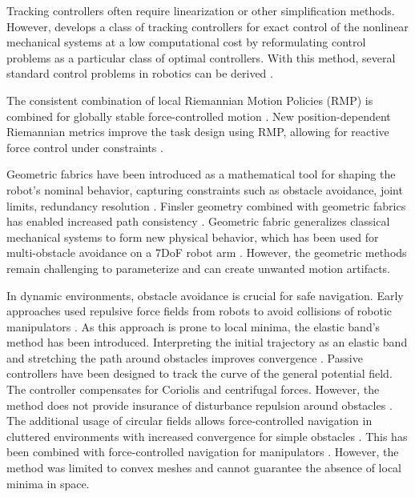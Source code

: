 \documentclass[conference]{IEEEtran}
\begin{document}
Tracking controllers often require linearization or other simplification methods. However, \cite{udwadia2003new} develops a class of tracking controllers for exact control of the nonlinear mechanical systems at a low computational cost by reformulating control problems as a particular class of optimal controllers. With this method, several standard control problems in robotics can be derived \cite{peters2008unifying}.

The consistent combination of local Riemannian Motion Policies (RMP) is combined for globally stable force-controlled motion \cite{cheng2020rmp}.
New position-dependent Riemannian metrics improve the task design using RMP, allowing for reactive force control under constraints \cite{bylard2021composable}.

Geometric fabrics have been introduced as a mathematical tool for shaping the robot's nominal behavior, capturing constraints such as obstacle avoidance, joint limits, redundancy resolution
\cite{xie2020geometric}.
Finsler geometry combined with geometric fabrics has enabled increased path consistency \cite{ratliff2021generalized}.
Geometric fabric generalizes classical mechanical systems to form new physical behavior, which has been used for multi-obstacle avoidance on a 7DoF robot arm \cite{van2022geometric}.
However, the geometric methods remain challenging to parameterize and can create unwanted motion artifacts.
 

In dynamic environments, obstacle avoidance is crucial for safe navigation. Early approaches used repulsive force fields from robots to avoid collisions of robotic manipulators \cite{khatib1987unified}. 
As this approach is prone to local minima, the elastic band's method has been introduced. Interpreting the initial trajectory as an elastic band and stretching the path around obstacles improves convergence  
\cite{
brock2002task, %
brock2002elastic}.
Passive controllers have been designed to track the curve of the general potential field. The controller compensates for Coriolis and centrifugal forces. However, the method does not provide insurance of disturbance repulsion around obstacles \cite{duindam2004passive}. 
The additional usage of circular fields \cite{singh1996real} allows force-controlled navigation in cluttered environments with increased convergence for simple obstacles
\cite{haddadin2011dynamic}.
This has been combined with force-controlled navigation for manipulators \cite{tulbure2020closing}. However, the method was limited to convex meshes and cannot guarantee the absence of local minima in space.
\end{document}
